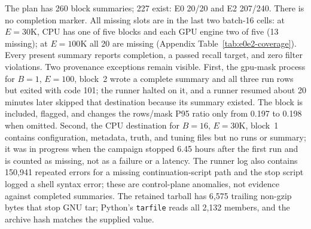 \documentclass[10pt]{article}
\begin{document}
The plan has 260 block summaries; 227 exist: E0 20/20 and E2 207/240. There is no completion marker. All missing slots are in the last two batch-16 cells: at $E=30$K, CPU has one of five blocks and each GPU engine two of five (13 missing); at $E=100$K all 20 are missing (Appendix Table~\ref{tab:e0e2-coverage}). Every present summary reports completion, a passed recall target, and zero filter violations. Two provenance exceptions remain visible. First, the gpu-mask process for $B=1$, $E=100$, block~2 wrote a complete summary and all three run rows but exited with code 101; the runner halted on it, and a runner resumed about 20 minutes later skipped that destination because its summary existed. The block is included, flagged, and changes the rows/mask P95 ratio only from 0.197 to 0.198 when omitted. Second, the CPU destination for $B=16$, $E=30$K, block~1 contains configuration, metadata, truth, and tuning files but no runs or summary; it was in progress when the campaign stopped 6.45 hours after the first run and is counted as missing, not as a failure or a latency. The runner log also contains 150,941 repeated errors for a missing continuation-script path and the stop script logged a shell syntax error; these are control-plane anomalies, not evidence against completed summaries. The retained tarball has 6,575 trailing non-gzip bytes that stop GNU tar; Python's \texttt{tarfile} reads all 2,132 members, and the archive hash matches the supplied value.
\end{document}
